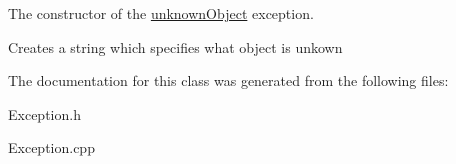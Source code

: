 The constructor of the \hyperlink{classunknown_object}{unknown\-Object} exception. 

Creates a string which specifies what object is unkown 

The documentation for this class was generated from the following files\-:\begin{DoxyCompactItemize}
\item 
Exception.\-h\item 
Exception.\-cpp\end{DoxyCompactItemize}
